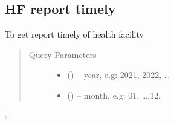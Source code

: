\documentclass[letterpaper,10pt,english,openany,oneside]{sphinxmanual}
\begin{document}
\subsection{HF report timely}
\label{\detokenize{api-cmi/v1:hf-report-timely}}

\begin{fulllineitems}
\label{\detokenize{api-cmi/v1:get--api-malaria-info-v1-Surveillance-hf_report_timely}}
\sphinxAtStartPar
To get report timely of health facility
\begin{quote}\begin{description}
\item[{Query Parameters}] \leavevmode\begin{itemize}
\item {} 
\sphinxAtStartPar
{} () – year, e.g: 2021, 2022, …

\item {} 
\sphinxAtStartPar
{} () – month, e.g: 01, …,12.

\end{itemize}

\end{description}\end{quote}

\sphinxAtStartPar
{}:

\begin{sphinxVerbatim}[commandchars=\\\{\}]
   
   
   \PYG{p}{[}
           
           
           
           
           
           
  \PYG{p}{]}
\end{sphinxVerbatim}

\end{fulllineitems}
\end{document}
